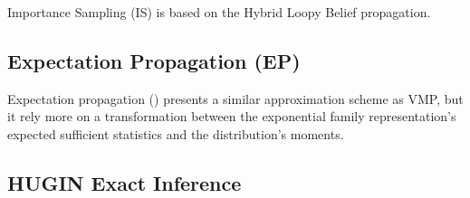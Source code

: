 Importance Sampling (IS) \cite{Yuan2007} is based on the Hybrid Loopy Belief propagation.


\subsection{Expectation Propagation (EP)} \label{EP}

Expectation propagation () \cite{Minka2001} presents a similar approximation scheme as VMP, but it rely more on a transformation between the exponential family representation's expected sufficient statistics and the distribution's moments.


\subsection{HUGIN Exact Inference} \label{HuginInference}

